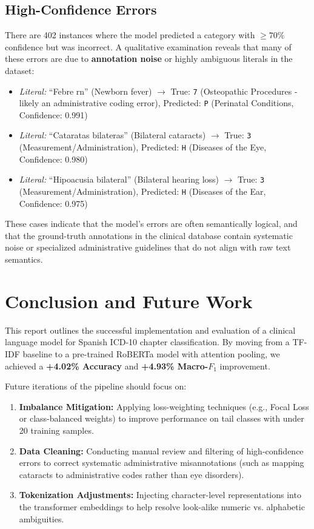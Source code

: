 \documentclass[11pt,a4paper]{article}
\begin{document}
\subsection{High-Confidence Errors}
There are 402 instances where the model predicted a category with $\ge 70\%$ confidence but was incorrect. A qualitative examination reveals that many of these errors are due to \textbf{annotation noise} or highly ambiguous literals in the dataset:
\begin{itemize}
    \item \textit{Literal:} ``Febre rn'' (Newborn fever) $\rightarrow$ True: \texttt{7} (Osteopathic Procedures - likely an administrative coding error), Predicted: \texttt{P} (Perinatal Conditions, Confidence: 0.991)
    \item \textit{Literal:} ``Cataratas bilateras'' (Bilateral cataracts) $\rightarrow$ True: \texttt{3} (Measurement/Administration), Predicted: \texttt{H} (Diseases of the Eye, Confidence: 0.980)
    \item \textit{Literal:} ``Hipoacusia bilateral'' (Bilateral hearing loss) $\rightarrow$ True: \texttt{3} (Measurement/Administration), Predicted: \texttt{H} (Diseases of the Ear, Confidence: 0.975)
\end{itemize}
These cases indicate that the model's errors are often semantically logical, and that the ground-truth annotations in the clinical database contain systematic noise or specialized administrative guidelines that do not align with raw text semantics.

\section{Conclusion and Future Work}
This report outlines the successful implementation and evaluation of a clinical language model for Spanish ICD-10 chapter classification. By moving from a TF-IDF baseline to a pre-trained RoBERTa model with attention pooling, we achieved a \textbf{+4.02\% Accuracy} and \textbf{+4.93\% Macro-$F_1$} improvement.

Future iterations of the pipeline should focus on:
\begin{enumerate}
    \item \textbf{Imbalance Mitigation:} Applying loss-weighting techniques (e.g., Focal Loss or class-balanced weights) to improve performance on tail classes with under 20 training samples.
    \item \textbf{Data Cleaning:} Conducting manual review and filtering of high-confidence errors to correct systematic administrative misannotations (such as mapping cataracts to administrative codes rather than eye disorders).
    \item \textbf{Tokenization Adjustments:} Injecting character-level representations into the transformer embeddings to help resolve look-alike numeric vs. alphabetic ambiguities.
\end{enumerate}
\end{document}
